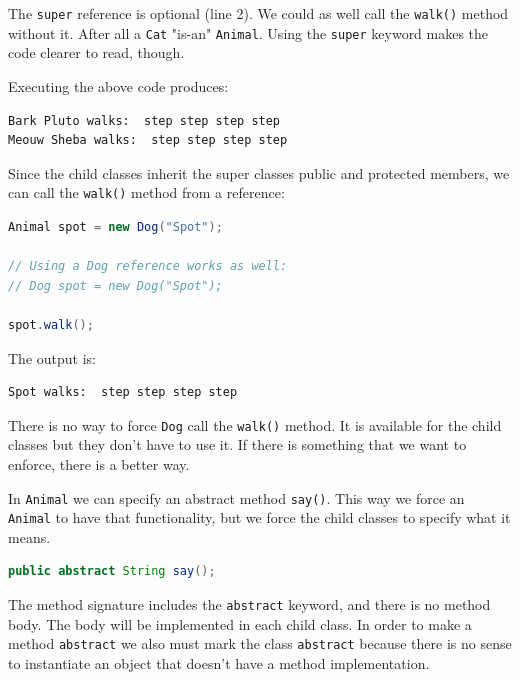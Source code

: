 The \texttt{super} reference is optional (line 2). We could as well call the \texttt{walk()} method without it. After all a \texttt{Cat} "is-an" \texttt{Animal}. Using the \texttt{super} keyword makes the code clearer to read, though.

Executing the above code produces:
\begin{lstlisting}
Bark Pluto walks:  step step step step
Meouw Sheba walks:  step step step step
\end{lstlisting}


Since the child classes inherit the super classes public and protected members, we can call the \texttt{walk()} method from a reference:

\begin{lstlisting}[language=Java]
Animal spot = new Dog("Spot");

// Using a Dog reference works as well:
// Dog spot = new Dog("Spot"); 

spot.walk();
\end{lstlisting}

The output is:

\begin{lstlisting}
Spot walks:  step step step step
\end{lstlisting}

There is no way to force \texttt{Dog} call the \texttt{walk()} method. It is available for the child classes but they don't have to use it. If there is something that we want to enforce, there is a better way.

In \texttt{Animal} we can specify an abstract method \texttt{say()}. This way we force an \texttt{Animal} to have that functionality, but we force the child classes to specify what it means. 
\begin{lstlisting}[language=Java]
public abstract String say();
\end{lstlisting}

The method signature includes the \texttt{abstract} keyword, and there is no method body. The body will be implemented in each child class. In order to make a method \texttt{abstract} we also must mark the class \texttt{abstract} because there is no sense to instantiate an object that doesn't have a method implementation.

